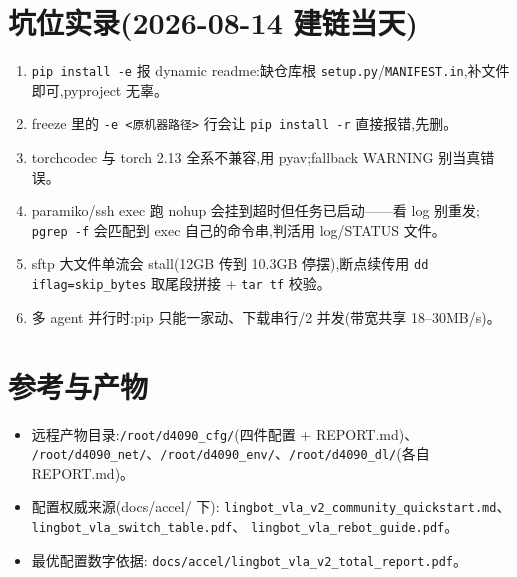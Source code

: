\documentclass[11pt]{ctexart}
\begin{document}
\section{坑位实录(2026-08-14 建链当天)}
\begin{enumerate}
\item \texttt{pip install -e} 报 dynamic readme:缺仓库根 \texttt{setup.py}/\texttt{MANIFEST.in},补文件即可,pyproject 无辜。
\item freeze 里的 \texttt{-e <原机器路径>} 行会让 \texttt{pip install -r} 直接报错,先删。
\item torchcodec 与 torch 2.13 全系不兼容,用 pyav;fallback WARNING 别当真错误。
\item paramiko/ssh exec 跑 nohup 会挂到超时但任务已启动——看 log 别重发;
\texttt{pgrep -f} 会匹配到 exec 自己的命令串,判活用 log/STATUS 文件。
\item sftp 大文件单流会 stall(12GB 传到 10.3GB 停摆),断点续传用
\texttt{dd iflag=skip\_bytes} 取尾段拼接 + \texttt{tar tf} 校验。
\item 多 agent 并行时:pip 只能一家动、下载串行/2 并发(带宽共享 18--30MB/s)。
\end{enumerate}

\section*{参考与产物}
\begin{itemize}[itemsep=0pt,topsep=1pt,parsep=0pt]
\item 远程产物目录:\texttt{/root/d4090\_cfg/}(四件配置 + REPORT.md)、
\texttt{/root/d4090\_net/}、\texttt{/root/d4090\_env/}、\texttt{/root/d4090\_dl/}(各自 REPORT.md)。
\item 配置权威来源(docs/accel/ 下):\newline
\texttt{lingbot\_vla\_v2\_community\_quickstart.md}、
\texttt{lingbot\_vla\_switch\_table.pdf}、
\texttt{lingbot\_vla\_rebot\_guide.pdf}。
\item 最优配置数字依据:\newline
\texttt{docs/accel/lingbot\_vla\_v2\_total\_report.pdf}。
\end{itemize}
\end{document}
